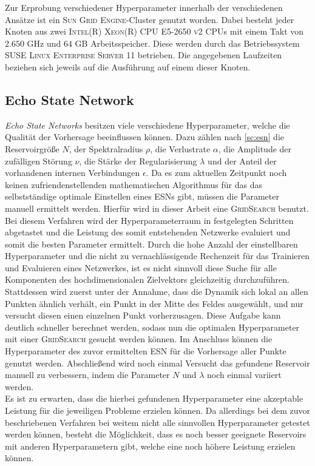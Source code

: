 Zur Erprobung verschiedener Hyperparameter innerhalb der verschiedenen Ansätze ist ein \textsc{Sun Grid Engine}-Cluster genutzt worden. Dabei besteht jeder Knoten aus zwei \textsc{Intel(R) Xeon(R) CPU E5-2650 v2} CPUs mit einem Takt von $2.650$ GHz und $64$ GB Arbeitsspeicher. Diese werden durch das Betriebssystem \textsc{SUSE Linux Enterprise Server 11} betrieben. Die angegebenen Laufzeiten beziehen sich jeweils auf die Ausführung auf einem dieser Knoten. 


\FloatBarrier
\subsection{Echo State Network}
\label{sec:exp_general_esn}
\textit{Echo State Networks} besitzen viele verschiedene Hyperparameter, welche die Qualität der Vorhersage beeinflussen können. Dazu zählen nach \ref{sc:esn} die Reservoirgröße $N$, der Spektralradius $\rho$, die Verlustrate $\alpha$, die Amplitude der zufälligen Störung $\nu$, die Stärke der Regularisierung $\lambda$ und der Anteil der vorhandenen internen Verbindungen $\epsilon$. Da es zum aktuellen Zeitpunkt noch keinen zufriendenstellenden mathematischen Algorithmus für das das selbstständige optimale Einstellen eines \textsc{ESN}s gibt, müssen die Parameter manuell ermittelt werden. Hierfür wird in dieser Arbeit eine \textsc{GridSearch} benutzt. Bei diesem Verfahren wird der Hyperparameterraum in festgelegten Schritten abgetastet und die Leistung des somit entstehenden Netzwerke evaluiert und somit die besten Parameter ermittelt. Durch die hohe Anzahl der einstellbaren Hyperparameter und die nicht zu vernachlässigende Rechenzeit für das Trainieren und Evaluieren eines Netzwerkes, ist es nicht sinnvoll diese Suche für alle Komponenten des hochdimensionalen Zielvektors gleichzeitig durchzuführen. Stattdessen wird zuerst unter der Annahme, dass die Dynamik sich lokal an allen Punkten ähnlich verhält, ein Punkt in der Mitte des Feldes ausgewählt, und nur versucht diesen einen einzelnen Punkt vorherzusagen. Diese Aufgabe kann deutlich schneller berechnet werden, sodass nun die optimalen Hyperparameter mit einer \textsc{GridSearch} gesucht werden können. Im Anschluss können die Hyperparameter des  zuvor ermittelten \textsc{ESN} für die Vorhersage aller Punkte genutzt werden. Abschließend wird noch einmal Versucht das gefundene Reservoir manuell zu verbessern, indem die Parameter $N$ und $\lambda$ noch einmal variiert werden.\\
Es ist zu erwarten, dass die hierbei gefundenen Hyperparameter eine akzeptable Leistung für die jeweiligen Probleme erzielen können. Da allerdings bei dem zuvor beschriebenen Verfahren bei weitem nicht alle sinnvollen Hyperparameter getestet werden können, besteht die Möglichkeit, dass es noch besser geeignete Reservoirs mit anderen Hyperparametern gibt, welche eine noch höhere Leistung erzielen können.\\

